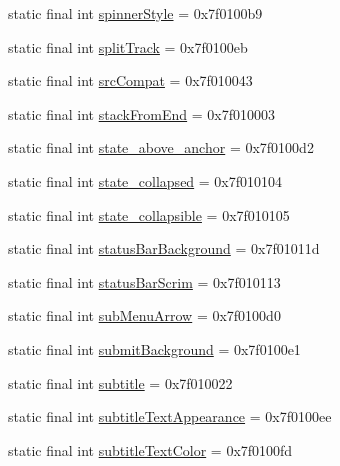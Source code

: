 \begin{CompactItemize}
\item 
static final int \hyperlink{classandroid_1_1support_1_1v7_1_1palette_1_1_r_1_1attr_0ca966df0c89098562286878d907f4db}{spinnerStyle} = 0x7f0100b9
\item 
static final int \hyperlink{classandroid_1_1support_1_1v7_1_1palette_1_1_r_1_1attr_1d88158106a3a5d9f00ea0e9121464f6}{splitTrack} = 0x7f0100eb
\item 
static final int \hyperlink{classandroid_1_1support_1_1v7_1_1palette_1_1_r_1_1attr_d9a4d8f8d7bdb405d28e21ca37b210c7}{srcCompat} = 0x7f010043
\item 
static final int \hyperlink{classandroid_1_1support_1_1v7_1_1palette_1_1_r_1_1attr_92b49481617d0343752fd7e036c19f15}{stackFromEnd} = 0x7f010003
\item 
static final int \hyperlink{classandroid_1_1support_1_1v7_1_1palette_1_1_r_1_1attr_2e8adfa2c885c7eea0d8ae12a4f2b0c4}{state\_\-above\_\-anchor} = 0x7f0100d2
\item 
static final int \hyperlink{classandroid_1_1support_1_1v7_1_1palette_1_1_r_1_1attr_cf7c262e5dd00bf960f08b3afe01f03e}{state\_\-collapsed} = 0x7f010104
\item 
static final int \hyperlink{classandroid_1_1support_1_1v7_1_1palette_1_1_r_1_1attr_1bbf3b63a209eb7808c3303876988ab9}{state\_\-collapsible} = 0x7f010105
\item 
static final int \hyperlink{classandroid_1_1support_1_1v7_1_1palette_1_1_r_1_1attr_e511835ab000b4856dfc000e07ea59a2}{statusBarBackground} = 0x7f01011d
\item 
static final int \hyperlink{classandroid_1_1support_1_1v7_1_1palette_1_1_r_1_1attr_9b2028c054532d4af4811d8fec9f550e}{statusBarScrim} = 0x7f010113
\item 
static final int \hyperlink{classandroid_1_1support_1_1v7_1_1palette_1_1_r_1_1attr_091a2ffc65b3eda9e7938cbace4b20f0}{subMenuArrow} = 0x7f0100d0
\item 
static final int \hyperlink{classandroid_1_1support_1_1v7_1_1palette_1_1_r_1_1attr_9a36154e856578ee7d0308d8cbef5cb9}{submitBackground} = 0x7f0100e1
\item 
static final int \hyperlink{classandroid_1_1support_1_1v7_1_1palette_1_1_r_1_1attr_c36c0198b02f965b4485fc62fcb0ff25}{subtitle} = 0x7f010022
\item 
static final int \hyperlink{classandroid_1_1support_1_1v7_1_1palette_1_1_r_1_1attr_3c41075084d4d7fc04e24f552a0cac50}{subtitleTextAppearance} = 0x7f0100ee
\item 
static final int \hyperlink{classandroid_1_1support_1_1v7_1_1palette_1_1_r_1_1attr_7df0f069537398339929710286feb817}{subtitleTextColor} = 0x7f0100fd

\end{CompactItemize}
